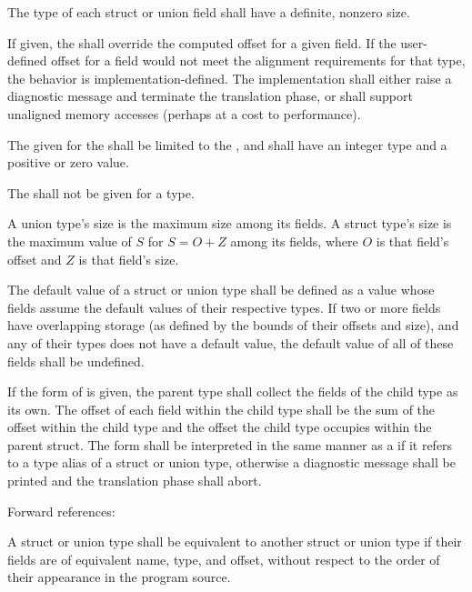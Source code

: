 \specsubsubitem
The type of each struct or union field shall have a definite, nonzero size.

\specsubsubitem
If given, the  shall override the computed offset
for a given field. If the user-defined offset for a field would not meet the
alignment requirements for that type, the behavior is implementation-defined.
The implementation shall either raise a diagnostic message and terminate the
translation phase, or shall support unaligned memory accesses (perhaps at a
cost to performance).

\specsubsubitem
The  given for the  shall
be limited to the , and
shall have an integer type and a positive or zero value.

\specsubsubitem
The  shall not be given for a 
type.

\specsubsubitem
A union type's size is the maximum size among its fields. A struct type's size
is the maximum value of $S$ for $S = O+Z$ among its fields, where $O$ is that
field's offset and $Z$ is that field's size.

\specsubsubitem
The default value of a struct or union type shall be defined as a value whose
fields assume the default values of their respective types. If two or more
fields have overlapping storage (as defined by the bounds of their offsets and
size), and any of their types does not have a default value, the default value
of all of these fields shall be undefined.

\specsubsubitem
If the  form of 
is given, the parent type shall collect the fields of the child type as its
own. The offset of each field within the child type shall be the sum of the
offset within the child type and the offset the child type occupies within the
parent struct. The  form shall be interpreted in the same
manner as a  if it refers to a type alias of a
struct or union type, otherwise a diagnostic message shall be printed and the
translation phase shall abort.

Forward references: 

\specsubsubitem
A struct or union type shall be equivalent to another struct or union type if
their fields are of equivalent name, type, and offset, without respect to the
order of their appearance in the program source.

